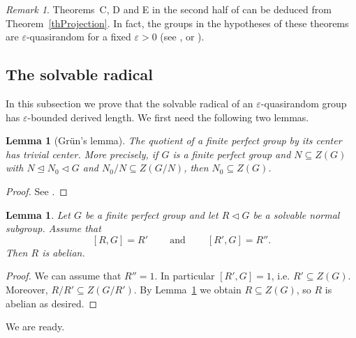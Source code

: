 \documentclass[11pt,reqno]{amsart}
\numberwithin{equation}{section}
\newtheorem{lemma}[theorem]{Lemma}
\theoremstyle{definition}
\theoremstyle{remark}
\newtheorem{remark}[theorem]{Remark}
\begin{document}
\begin{remark} \label{remGS}
Theorems~C, D and E in the second half of \cite{GS25} can be deduced from Theorem~\ref{thProjection}.
In fact, the groups in the hypotheses of these theorems are $\varepsilon$-quasirandom for a fixed $\varepsilon>0$
(see \cite[Lemma~20]{GS25}, or \cite[Lemma~4.1]{BS25}).
\end{remark}








\subsection{The solvable radical}

In this subsection we prove that
the solvable radical of an $\varepsilon$-quasirandom group has $\varepsilon$-bounded derived length.
We first need the following two lemmas.

\begin{lemma}[Gr\"un's lemma] \label{lemGrun}
The quotient of a finite perfect group by its center has trivial center.
More precisely, if $G$ is a finite perfect group and $N \subseteq Z(G)$
with $N \unlhd N_0 \lhd G$ and $N_0/N \subseteq Z(G/N)$,
then $N_0 \subseteq Z(G)$.
\end{lemma}
\begin{proof}
See \cite[Lemma~2.10]{BS25}.
\end{proof}

\begin{lemma} \label{lemTwoSteps}
Let $G$ be a finite perfect group and let $R \lhd G$ be a solvable normal subgroup.
Assume that
$$ [R,G]=R' \qquad~\text{and}~\qquad [R',G]=R'' . $$
Then $R$ is abelian.
\end{lemma}
\begin{proof}
We can assume that $R''=1$.
In particular $[R',G]=1$, i.e. $R' \subseteq Z(G)$.
Moreover, $R/R' \subseteq Z(G/R')$.
By Lemma~\ref{lemGrun} we obtain $R \subseteq Z(G)$,
so $R$ is abelian as desired.
\end{proof}

We are ready.
\end{document}

